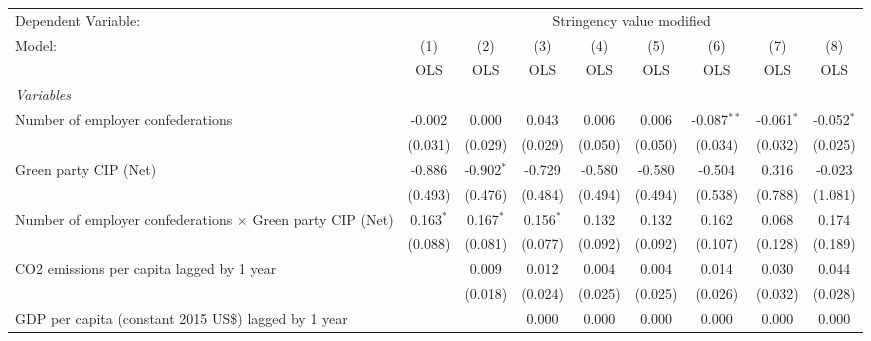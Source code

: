 
\begingroup
\centering
\begin{tabular}{lcccccccc}
   \toprule
   Dependent Variable: & \multicolumn{8}{c}{Stringency value modified}\\
   Model:                                                            & (1)         & (2)          & (3)         & (4)           & (5)           & (6)           & (7)          & (8)\\  
                                                                     &  OLS        & OLS          & OLS         & OLS           & OLS           & OLS           & OLS          & OLS\\  
   \midrule
   \emph{Variables}\\
   Number of employer confederations                                 & -0.002      & 0.000        & 0.043       & 0.006         & 0.006         & -0.087$^{**}$ & -0.061$^{*}$ & -0.052$^{*}$\\   
                                                                     & (0.031)     & (0.029)      & (0.029)     & (0.050)       & (0.050)       & (0.034)       & (0.032)      & (0.025)\\   
   Green party CIP (Net)                                             & -0.886      & -0.902$^{*}$ & -0.729      & -0.580        & -0.580        & -0.504        & 0.316        & -0.023\\   
                                                                     & (0.493)     & (0.476)      & (0.484)     & (0.494)       & (0.494)       & (0.538)       & (0.788)      & (1.081)\\   
   Number of employer confederations $\times$ Green party CIP (Net)  & 0.163$^{*}$ & 0.167$^{*}$  & 0.156$^{*}$ & 0.132         & 0.132         & 0.162         & 0.068        & 0.174\\   
                                                                     & (0.088)     & (0.081)      & (0.077)     & (0.092)       & (0.092)       & (0.107)       & (0.128)      & (0.189)\\   
   CO2 emissions per capita lagged by 1 year                         &             & 0.009        & 0.012       & 0.004         & 0.004         & 0.014         & 0.030        & 0.044\\   
                                                                     &             & (0.018)      & (0.024)     & (0.025)       & (0.025)       & (0.026)       & (0.032)      & (0.028)\\   
   GDP per capita (constant 2015 US\$) lagged by 1 year              &             &              & 0.000       & 0.000         & 0.000         & 0.000         & 0.000        & 0.000\\   

\end{tabular}
